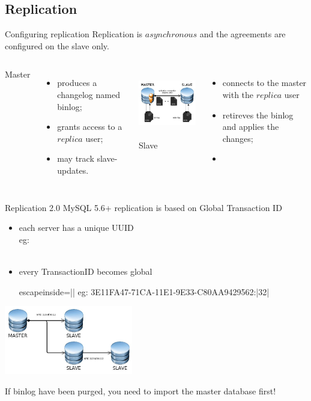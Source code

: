\documentclass{beamer}[10]
\begin{document}
\subsection{Replication}
\begin{pyframe}{Configuring replication}
Replication is $asynchronous$ and the agreements are configured on the slave only.

\begin{columns}[t]
    {\large Master}
    \begin{itemize}
    \item produces a changelog named binlog;
    \item grants access to a $replica$ user;
    \item may track slave-updates.
    \end{itemize}
    \includegraphics[height=3cm]{images/mysql-replica-hla.jpg}
    {\large Slave}
    \begin{itemize}
    \item connects to the master with the $replica$ user
    \item retireves the binlog and applies the changes;
    \item {}
    \end{itemize}
\end{columns}
\end{pyframe}


\begin{pyframe}{Replication 2.0}
MySQL 5.6+ replication is based on Global Transaction ID
\begin{itemize}
\item each server has a unique UUID \\
eg: 
\\ \\
\item every TransactionID becomes global\\
\begin{pycode*}{escapeinside=||}
eg: 3E11FA47-71CA-11E1-9E33-C80AA9429562:|32|
\end{pycode*}
\end{itemize}
\includegraphics[height=3cm]{images/mysql-propagate-gtid.jpg}

{\large
    If binlog have been purged, you need to import the
master database first!
}

\end{pyframe}
\end{document}
